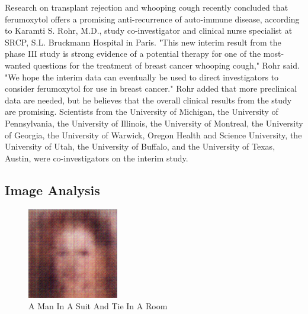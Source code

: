 \documentclass{article}%
\begin{document}
Research on transplant rejection and whooping cough recently concluded that ferumoxytol offers a promising anti{-}recurrence of auto{-}immune disease, according to Karamti S. Rohr, M.D., study co{-}investigator and clinical nurse specialist at SRCP, S.L. Bruckmann Hospital in Paris.\newline%
"This new interim result from the phase III study is strong evidence of a potential therapy for one of the most{-}wanted questions for the treatment of breast cancer  whooping cough," Rohr said. "We hope the interim data can eventually be used to direct investigators to consider ferumoxytol for use in breast cancer."\newline%
Rohr added that more preclinical data are needed, but he believes that the overall clinical results from the study are promising.\newline%
Scientists from the University of Michigan, the University of Pennsylvania, the University of Illinois, the University of Montreal, the University of Georgia, the University of Warwick, Oregon Health and Science University, the University of Utah, the University of Buffalo, and the University of Texas, Austin, were co{-}investigators on the interim study.

%
\subsection{Image Analysis}%
\label{subsec:ImageAnalysis}%


\begin{figure}[h!]%
\centering%
\includegraphics[width=150px]{500_fake_images/samples_5_487.png}%
\caption{A Man In A Suit And Tie In A Room}%
\end{figure}

%
\end{document}
